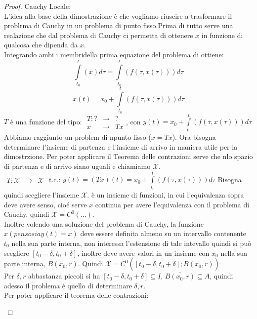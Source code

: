 \begin{proof}
	Cauchy Locale:\\
	L'idea alla base della dimostrazione è che vogliamo riuscire a trasformare il problrma di Cauchy in un problema di punto fisso.Prima di tutto serve una realazione che dal problema di Cauchy ci permetta di ottenere $x$ in funzione di qualcosa che dipenda da $x$.\\
	Integrando ambi i membridella prima equazione del problema di ottiene:
	$$\int\limits_{t_0}^t(\overset{\cdot}{x})d\tau=\int\limits_{t_0}^t(f(\tau,x(\tau)))d\tau$$
	$$x(t)=x_0+\int\limits_{t_0}^t(f(\tau,x(\tau)))d\tau$$
	$T$ è una funzione del tipo:
	$\begin{array}{rcl} T: ? & \to & ? \\ x & \to & Tx \end{array}$, con $y(t)=x_0+\int\limits_{t_0}^t(f(\tau,x(\tau)))d\tau$\\
	Abbiamo raggiunto un problem di npunto fisso ($x=Tx$). Ora bisogna determinare l'insieme di partenza e l'insieme di arrivo in maniera utile per la dimostrzione. Per poter applicare il Teorema delle contrazioni serve che nlo spazio di partenza e di arrivo siano uguali e chiamiamo $\mathcal{X}$.\\
	$\begin{array}{rcl} T: \mathcal{X} & \to & \mathcal{X} \end{array}$ t.c.: $y(t)=(Tx)(t)=x_0+\int\limits_{t_0}^t(f(\tau,x(\tau)))d\tau$
	Bisogna quindi scegliere l'insieme $\mathcal{X}$. è un insieme di funzioni, in cui l'equivalenza sopra deve avere senso, cio\'e serve $x$ continua per avere l'equivalenza con il problema di Cauchy, quindi $\mathcal{X}=C^0(\ldots)$.\\
	Inoltre volendo una soluzione del problema di Cauchy, la funzione $x(penso sia y(t)=x)$ deve essere definita almeno su un intervallo contenente $t_0$ nella sua parte interna, non interessa l'estensione di tale intevallo quindi si può scegliere $\left[t_0-\delta,t_0+\delta\right]$, inoltre deve avere valori in un insieme con $x_0$ nella sua parte interna, $\overline{B(x_0,r)}$. Quindi $\mathcal{X}=C^0(\left[t_0-\delta,t_0+\delta\right];\overline{B(x_0,r)})$\\
	Per $\delta, r$ abbastanza piccoli si ha $\left[t_0-\delta,t_0+\delta\right]\subseteq I$, $\overline{B(x_0,r)}\subseteq A$, quindi adesso il problema è quello di determinare $\delta, r$.\\
	Per poter applicare il teorema delle contrazioni:
	\begin{description}

\end{description}
\end{proof}
